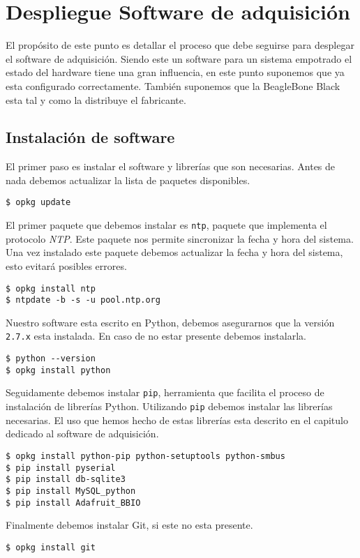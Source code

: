 \appendix

\chapter{Despliegue Software de adquisición}
	El propósito de este punto es detallar el proceso que debe seguirse para desplegar el software de adquisición. Siendo este un software para un
	sistema empotrado el estado del hardware tiene una gran influencia, en este punto suponemos que ya esta configurado correctamente. También
	suponemos que la BeagleBone Black esta tal y como la distribuye el fabricante.
	\section{Instalación de software} 
		El primer paso es instalar el software y librerías que son necesarias. Antes de nada debemos actualizar la lista de paquetes
		disponibles. 
		\begin{lstlisting}[style=myBash]
$ opkg update
		\end{lstlisting}
		\par
		El primer paquete que debemos instalar es \texttt{ntp}, paquete que implementa el protocolo \emph{NTP}. Este paquete nos permite
		sincronizar la fecha y hora del sistema.  Una vez instalado este paquete debemos actualizar la fecha y hora del sistema, esto evitará
		posibles errores.
		\begin{lstlisting}[style=myBash]
$ opkg install ntp
$ ntpdate -b -s -u pool.ntp.org
		\end{lstlisting}
		\par
		Nuestro software esta escrito en Python, debemos asegurarnos que la versión \texttt{2.7.x} esta instalada. En caso de no estar
		presente debemos instalarla.
		\begin{lstlisting}[style=myBash]
$ python --version
$ opkg install python
		\end{lstlisting}
		Seguidamente debemos instalar \texttt{pip}, herramienta que facilita el proceso de instalación de librerías Python.  Utilizando
		\texttt{pip} debemos instalar las librerías necesarias. El uso que hemos hecho de estas librerías esta descrito en el capitulo
		dedicado al software de adquisición.
		\begin{lstlisting}[style=myBash]
$ opkg install python-pip python-setuptools python-smbus
$ pip install pyserial
$ pip install db-sqlite3
$ pip install MySQL_python
$ pip install Adafruit_BBIO
		\end{lstlisting}
		\par
		Finalmente debemos instalar Git, si este no esta presente.
		\begin{lstlisting}[style=myBash]
$ opkg install git
		\end{lstlisting}
